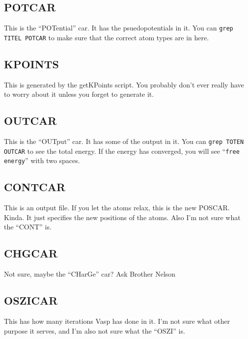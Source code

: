 \documentclass{article}
\begin{document}
\subsection*{POTCAR}
This is the ``POTential'' car. It has the psuedopotentials in it. You
can \verb|grep TITEL POTCAR| to make sure that the correct atom types
are in here.   

\subsection*{KPOINTS}
This is generated by the getKPoints script. You probably don't ever
really have to worry about it unless you forget to generate it. 

\subsection*{OUTCAR} 
This is the ``OUTput'' car. It has some of the output in it. You can
\verb|grep TOTEN OUTCAR|  to see the total energy. If the energy has
converged, you will see ``\verb|free  energy|'' with two spaces.

\subsection*{CONTCAR}
This is an output file. If you let the atoms relax, this is the new POSCAR. Kinda. It just
specifies the new positions of the atoms. Also I'm not sure what the
``CONT'' is. 

\subsection*{CHGCAR}
Not sure, maybe the ``CHarGe'' car? Ask Brother Nelson

\subsection*{OSZICAR}
This has how many iterations Vasp has done in it. I'm not sure what
other purpose it serves, and I'm also not sure what the ``OSZI'' is.
\end{document}
